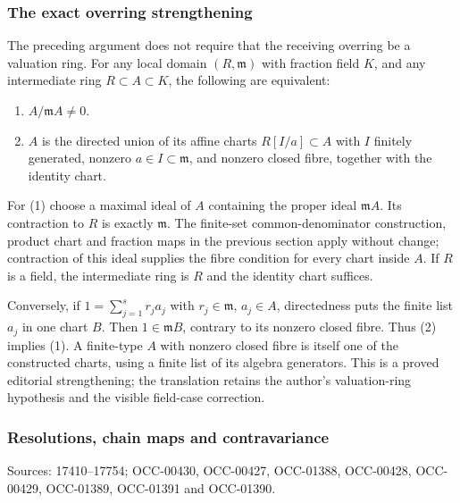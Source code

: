 \subsubsection{The exact overring strengthening}\label{algebra-proof-007-the-exact-overring-strengthening}

The preceding argument does not require that the receiving overring be a valuation ring. For any local domain \((R,\mathfrak m)\) with fraction field \(K\), and any intermediate ring \(R\subset A\subset K\), the following are equivalent:

\begin{enumerate}
\def\labelenumi{\arabic{enumi}.}
\tightlist
\item
  \(A/\mathfrak mA\ne0\).
\item
  \(A\) is the directed union of its affine charts \(R[I/a]\subset A\) with \(I\) finitely generated, nonzero \(a\in I\subset\mathfrak m\), and nonzero closed fibre, together with the identity chart.
\end{enumerate}

For (1) choose a maximal ideal of \(A\) containing the proper ideal \(\mathfrak mA\). Its contraction to \(R\) is exactly \(\mathfrak m\). The finite-set common-denominator construction, product chart and fraction maps in the previous section apply without change; contraction of this ideal supplies the fibre condition for every chart inside \(A\). If \(R\) is a field, the intermediate ring is \(R\) and the identity chart suffices.

Conversely, if \(1=\sum_{j=1}^s r_j a_j\) with \(r_j\in\mathfrak m\), \(a_j\in A\), directedness puts the finite list \(a_j\) in one chart \(B\). Then \(1\in\mathfrak mB\), contrary to its nonzero closed fibre. Thus (2) implies (1). A finite-type \(A\) with nonzero closed fibre is itself one of the constructed charts, using a finite list of its algebra generators. This is a proved editorial strengthening; the translation retains the author's valuation-ring hypothesis and the visible field-case correction.

\subsubsection{Resolutions, chain maps and contravariance}\label{algebra-proof-007-resolutions-chain-maps-and-contravariance}

Sources: 17410--17754; OCC-00430, OCC-00427, OCC-01388, OCC-00428, OCC-00429, OCC-01389, OCC-01391 and OCC-01390.

